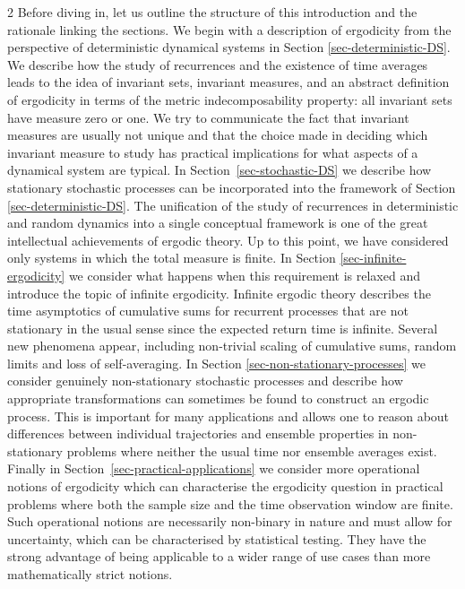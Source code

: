 \documentclass[11pt]{article}
\begin{document}
\begin{multicols}{2}
Before diving in, let us outline the structure of this introduction and the rationale linking the sections.
We begin with a description of ergodicity from the perspective of deterministic dynamical systems in Section \ref{sec-deterministic-DS}. We describe how the study of recurrences and the existence of time averages leads to the idea of invariant sets, invariant measures, and an abstract definition of ergodicity in terms of the metric indecomposability property: all invariant sets have measure zero or one. We try to communicate the fact that invariant measures are usually not unique and that the choice made in deciding which invariant measure to study has practical implications for what aspects of a dynamical system are typical.
In Section~\ref{sec-stochastic-DS} we describe how stationary stochastic processes can be incorporated into the framework of Section \ref{sec-deterministic-DS}.
The unification of the study of recurrences in deterministic and random dynamics into a single conceptual framework is one of the great intellectual achievements of ergodic theory.
Up to this point, we have considered only systems in which the total measure is finite.
In Section \ref{sec-infinite-ergodicity} we consider what happens when this requirement is relaxed and introduce the topic of infinite ergodicity.
Infinite ergodic theory describes the time asymptotics of cumulative sums for recurrent processes that are not stationary in the usual sense since the expected return time is infinite. 
Several new phenomena appear, including non-trivial scaling of cumulative sums, random limits and loss of self-averaging.
In Section \ref{sec-non-stationary-processes} we consider genuinely non-stationary stochastic processes and describe how appropriate transformations can sometimes be found to construct an ergodic process. This is important for many applications and allows one to reason about differences between individual trajectories and ensemble properties in non-stationary problems where neither the usual time nor ensemble averages exist.
Finally in Section~\ref{sec-practical-applications} we consider more operational notions of ergodicity which can characterise the ergodicity question in practical problems where both the sample size and the time observation window are finite. 
Such operational notions are necessarily non-binary in nature and must allow for uncertainty, which can be characterised by statistical testing.
They have the strong advantage of being applicable to a wider range of use cases than more mathematically strict notions.



\end{multicols}
\end{document}
